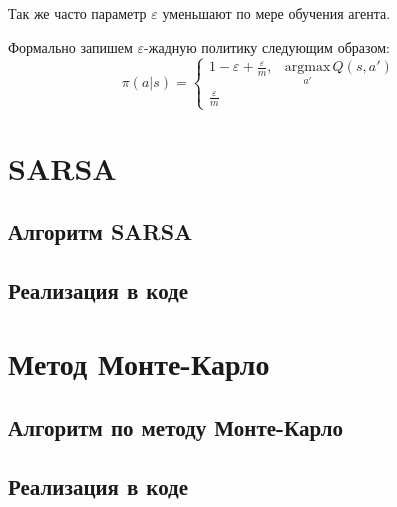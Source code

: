 Так же часто параметр $\varepsilon$ уменьшают по мере обучения агента.

Формально запишем $\varepsilon$-жадную политику следующим образом:
$$
\pi(a|s) = 
 \begin{cases}
	1 - \varepsilon + \frac{\varepsilon}{m},& \underset{a'}{\mathrm{arg max}}\, Q(s,a')\\
	\frac{\varepsilon}{m}
\end{cases}
$$





\section{SARSA}

\subsection{Алгоритм SARSA}

\subsection{Реализация в коде}

\section{Метод Монте-Карло}

\subsection{Алгоритм по методу Монте-Карло}

\subsection{Реализация в коде}



